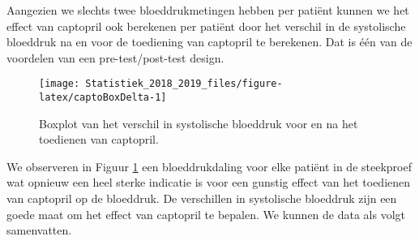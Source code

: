 \documentclass[12pt,dutch,coursenotes]{book}
\newenvironment{Shaded}{\begin{snugshade}}{\end{snugshade}}
\newcommand{\KeywordTok}[1]{\textcolor[rgb]{0.13,0.29,0.53}{\textbf{#1}}}
\newcommand{\DataTypeTok}[1]{\textcolor[rgb]{0.13,0.29,0.53}{#1}}
\newcommand{\DecValTok}[1]{\textcolor[rgb]{0.00,0.00,0.81}{#1}}
\newcommand{\StringTok}[1]{\textcolor[rgb]{0.31,0.60,0.02}{#1}}
\newcommand{\CommentTok}[1]{\textcolor[rgb]{0.56,0.35,0.01}{\textit{#1}}}
\newcommand{\OtherTok}[1]{\textcolor[rgb]{0.56,0.35,0.01}{#1}}
\newcommand{\OperatorTok}[1]{\textcolor[rgb]{0.81,0.36,0.00}{\textbf{#1}}}
\newcommand{\NormalTok}[1]{#1}
\theoremstyle{definition}
\theoremstyle{definition}
\theoremstyle{definition}
\theoremstyle{remark}
\begin{document}
Aangezien we slechts twee bloeddrukmetingen hebben per patiënt kunnen we
het effect van captopril ook berekenen per patiënt door het verschil in
de systolische bloeddruk na en voor de toediening van captopril te
berekenen. Dat is één van de voordelen van een pre-test/post-test
design.

\begin{Shaded}
\end{Shaded}

\begin{figure}

{\centering \texttt{[image: Statistiek\_2018\_2019\_files/figure-latex/captoBoxDelta-1]} 

}

\caption{Boxplot van het verschil in systolische bloeddruk voor en na het toedienen van captopril.}\label{fig:captoBoxDelta}
\end{figure}

We observeren in Figuur \ref{fig:captoBoxDelta} een bloeddrukdaling voor
elke patiënt in de steekproef wat opnieuw een heel sterke indicatie is
voor een gunstig effect van het toedienen van captopril op de bloeddruk.
De verschillen in systolische bloeddruk zijn een goede maat om het
effect van captopril te bepalen. We kunnen de data als volgt
samenvatten.
\end{document}
